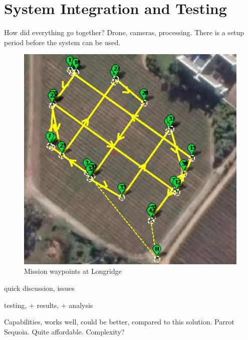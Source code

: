 \chapter{System Integration and Testing}

How did everything go together? Drone, cameras, processing. There is a setup period before the system can be used.

\begin{figure}[H]
\centering
\includegraphics[scale=0.4]{images/longridge_waypoints.jpg}
\caption{Mission waypoints at Longridge}
\label{fig:longridge_waypoints}
\end{figure}

quick discussion, issues

testing, + results, + analysis

Capabilities, works well, could be better, compared to this solution. Parrot Sequoia. Quite affordable. Complexity?